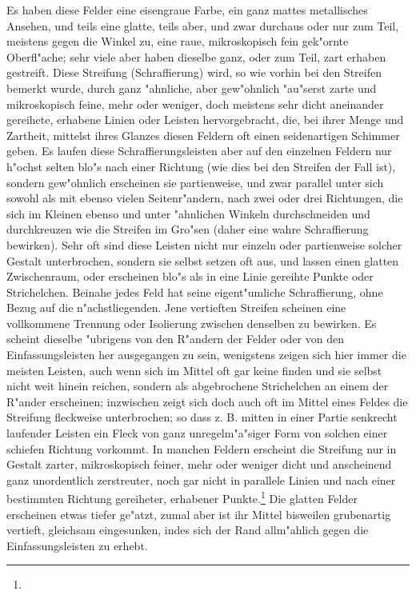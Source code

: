 \documentclass[a4paper, 11pt, oneside, german]{article}
\begin{document}
Es haben diese Felder eine eisengraue Farbe, ein ganz mattes metallisches Ansehen, und teils eine glatte, teils aber, und zwar durchaus oder nur zum Teil, meistens gegen die Winkel zu, eine raue, mikroskopisch fein gek"ornte Oberfl"ache; sehr viele aber haben dieselbe ganz, oder zum Teil, zart erhaben gestreift. Diese Streifung (Schraffierung) wird, so wie vorhin bei den Streifen bemerkt wurde, durch ganz "ahnliche, aber gew"ohnlich "au"serst zarte und mikroskopisch feine, mehr oder weniger, doch meistens sehr dicht aneinander gereihete, erhabene Linien oder Leisten hervorgebracht, die, bei ihrer Menge und Zartheit, mittelst ihres Glanzes diesen Feldern oft einen seidenartigen Schimmer geben. Es laufen diese Schraffierungsleisten aber auf den einzelnen Feldern nur h"ochst selten blo"s nach einer Richtung (wie dies bei den Streifen der Fall ist), sondern gew"ohnlich erscheinen sie partienweise, und zwar parallel unter sich sowohl als mit ebenso vielen Seitenr"andern, nach zwei oder drei Richtungen, die sich im Kleinen ebenso und unter "ahnlichen Winkeln durchschneiden und durchkreuzen wie die Streifen im Gro"sen (daher eine wahre Schraffierung bewirken). Sehr oft sind diese Leisten nicht nur einzeln oder partienweise solcher Gestalt unterbrochen, sondern sie selbst setzen oft aus, und lassen einen glatten Zwischenraum, oder erscheinen blo"s als in eine Linie gereihte Punkte oder Strichelchen. Beinahe jedes Feld hat seine eigent"umliche Schraffierung, ohne Bezug auf die n"achstliegenden. Jene vertieften Streifen scheinen eine vollkommene Trennung oder Isolierung zwischen denselben zu bewirken. Es scheint dieselbe "ubrigens von den R"andern der Felder oder von den Einfassungsleisten her ausgegangen zu sein, wenigstens zeigen sich hier immer die meisten Leisten, auch wenn sich im Mittel oft gar keine finden und sie selbst nicht weit hinein reichen, sondern als abgebrochene Strichelchen an einem der R"ander erscheinen; inzwischen zeigt sich doch auch oft im Mittel eines Feldes die Streifung fleckweise unterbrochen; so dass z. B. mitten in einer Partie senkrecht laufender Leisten ein Fleck von ganz unregelm"a"siger Form von solchen einer schiefen Richtung vorkommt. In manchen Feldern erscheint die Streifung nur in Gestalt zarter, mikroskopisch feiner, mehr oder weniger dicht und anscheinend ganz unordentlich zerstreuter, noch gar nicht in parallele Linien und nach einer bestimmten Richtung gereiheter, erhabener Punkte.\footnote{} Die glatten Felder erscheinen etwas tiefer ge"atzt, zumal aber ist ihr Mittel bisweilen grubenartig vertieft, gleichsam eingesunken, indes sich der Rand allm"ahlich gegen die Einfassungsleisten zu erhebt.
\end{document}
